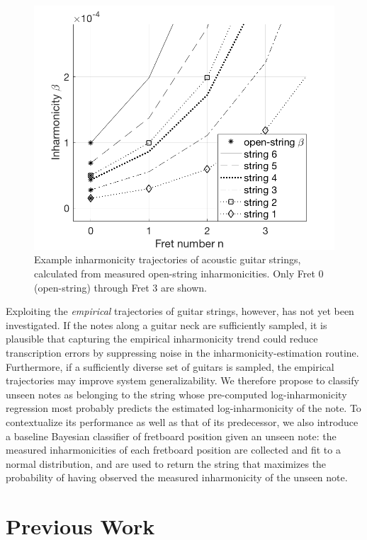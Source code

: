 \documentclass[convention,peer-reviewed]{aesconf}
\begin{document}
\begin{figure}[h] 
\centering
\includegraphics[scale=0.25]{figs/beta-trajectories-ag}
\caption{Example inharmonicity trajectories of acoustic guitar strings, calculated from measured open-string inharmonicities. Only Fret 0 (open-string) through Fret 3 are shown.}
\label{fig:beta-trajectories-ag}
\end{figure}

Exploiting the \textit{empirical} trajectories of guitar strings, however, has not yet been investigated. If the notes along a guitar neck are sufficiently sampled, it is plausible that capturing the empirical inharmonicity trend could reduce transcription errors by suppressing noise in the inharmonicity-estimation routine. Furthermore, if a sufficiently diverse set of guitars is sampled, the empirical trajectories may improve system generalizability. We therefore propose to classify unseen notes as belonging to the string whose pre-computed log-inharmonicity regression most probably predicts the estimated log-inharmonicity of the note. To contextualize its performance as well as that of its predecessor, we also introduce a baseline Bayesian classifier of fretboard position given an unseen note: the measured inharmonicities of each fretboard position are collected and fit to a normal distribution, and are used to return the string that maximizes the probability of having observed the measured inharmonicity of the unseen note.

\section{Previous Work}
\end{document}
